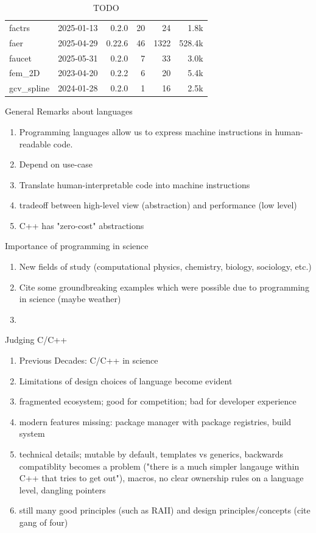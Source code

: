 \documentclass{article}
\begin{document}
\begin{table}
\begin{tabular}{l r r r r r}
        factrs           &2025-01-13 &0.2.0      &20   &24       &      1.8k\\
        faer             &2025-04-29 &0.22.6     &46   &1322     &    528.4k\\
        faucet           &2025-05-31 &0.2.0      &7    &33       &      3.0k\\
        fem\_2D          &2023-04-20 &0.2.2      &6    &20       &      5.4k\\
        gcv\_spline      &2024-01-28 &0.2.0      &1    &16       &      2.5k\\
        \bottomrule
    \end{tabular}
    \caption{TODO}
\end{table}

General Remarks about languages
\begin{enumerate}
    \item Programming languages allow us to express machine instructions in human-readable code.
    \item Depend on use-case
    \item Translate human-interpretable code into machine instructions
    \item tradeoff between high-level view (abstraction) and performance (low level)
    \item C++ has "zero-cost" abstractions
\end{enumerate}

Importance of programming in science
\begin{enumerate}
    \item New fields of study (computational physics, chemistry, biology, sociology, etc.)
    \item Cite some groundbreaking examples which were possible due to programming in
        science (maybe weather)
    \item
\end{enumerate}

Judging C/C++
\begin{enumerate}
    \item Previous Decades: C/C++ in science
    \item Limitations of design choices of language become evident
    \item fragmented ecosystem; good for competition; bad for developer experience
    \item modern features missing: package manager with package registries, build system
    \item technical details; mutable by default, templates vs generics, backwards
        compatiblity becomes a
        problem ("there is a much simpler langauge within C++ that tries to get out"),
        macros, no clear
        ownership rules on a language level, dangling pointers
    \item still many good principles (such as RAII) and design principles/concepts (cite
        gang of four)
\end{enumerate}
\end{document}
